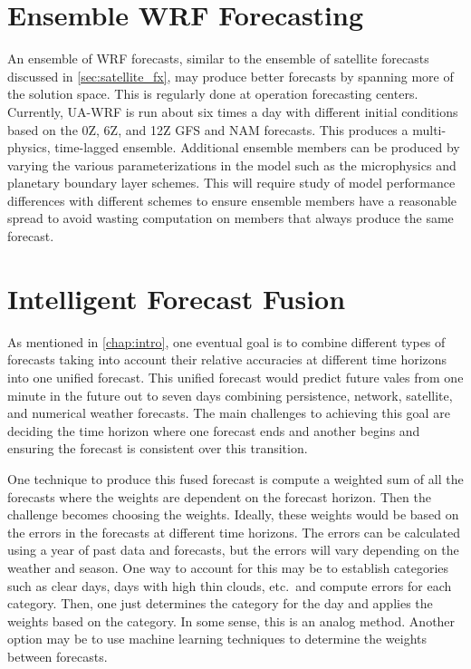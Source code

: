 \section{Ensemble WRF Forecasting}

An ensemble of WRF forecasts, similar to the ensemble of satellite
forecasts discussed in \cref{sec:satellite_fx}, may produce better
forecasts by spanning more of the solution space.
This is regularly done at operation forecasting centers.
Currently, UA-WRF is run about six times a day with different initial
conditions based on the 0Z, 6Z, and 12Z GFS and NAM forecasts.
This produces a multi-physics, time-lagged ensemble.
Additional ensemble members can be produced by varying the various
parameterizations in the model such as the microphysics and planetary
boundary layer schemes.
This will require study of model performance differences with
different schemes to ensure ensemble members have a reasonable spread
to avoid wasting computation on members that always produce the same
forecast.

\section{Intelligent Forecast Fusion}

As mentioned in \cref{chap:intro}, one eventual goal is to combine
different types of forecasts taking into account their relative
accuracies at different time horizons into one unified forecast.
This unified forecast would predict future vales from one minute in
the future out to seven days combining persistence, network,
satellite, and numerical weather forecasts.
The main challenges to achieving this goal are deciding the time
horizon where one forecast ends and another begins and ensuring the
forecast is consistent over this transition.

One technique to produce this fused forecast is compute a weighted sum
of all the forecasts where the weights are dependent on the forecast
horizon.
Then the challenge becomes choosing the weights.
Ideally, these weights would be based on the errors in the forecasts
at different time horizons.
The errors can be calculated using a year of past data and forecasts,
but the errors will vary depending on the weather and season.
One way to account for this may be to establish categories such as
clear days, days with high thin clouds, etc.\ and compute errors for
each category.
Then, one just determines the category for the day and applies the
weights based on the category.
In some sense, this is an analog method.
Another option may be to use machine learning techniques to determine
the weights between forecasts.

